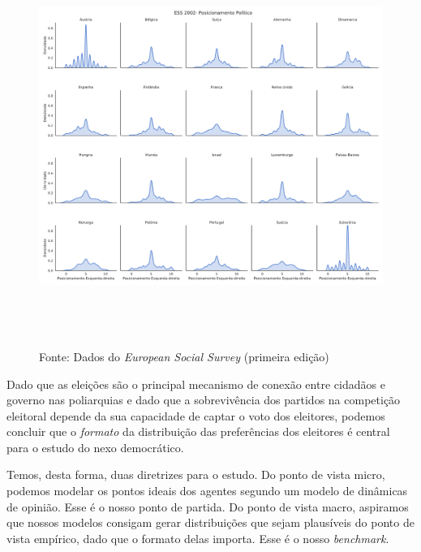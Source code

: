\begin{figure}[H]
  \centering \includegraphics[width=\textwidth, height=13cm]{ims/ess_2002_plots.pdf}
  Fonte: Dados do \textit{European Social Survey} (primeira edição)
\end{figure}

Dado que as eleições são o principal mecanismo de conexão entre cidadãos e
governo nas poliarquias \cite{dahl1989democracy} e dado que a sobrevivência dos
partidos na competição eleitoral depende da sua capacidade de captar o voto dos
eleitores, podemos concluir que o \textit{formato} da distribuição das
preferências dos eleitores é central para o estudo do nexo democrático.

Temos, desta forma, duas diretrizes para o estudo. Do ponto de vista micro,
podemos modelar os pontos ideais dos agentes segundo um modelo de dinâmicas de
opinião. Esse é o nosso ponto de partida. Do ponto de vista macro, aspiramos que
nossos modelos consigam gerar distribuições que sejam plausíveis do ponto de
vista empírico, dado que o formato delas importa. Esse é o nosso \textit{benchmark}.





